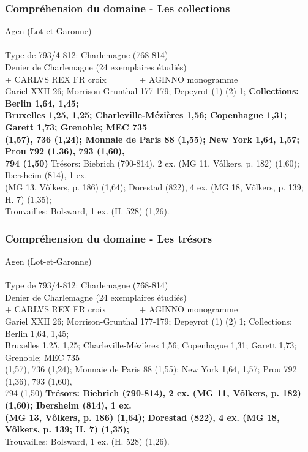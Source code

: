 \documentclass[10pt, compress]{beamer}
\begin{document}
\begin{frame}[fragile]
  \frametitle{Compréhension du domaine - Les collections}
  \begin{scriptsize}
\textcolor{light_gray}{Agen (Lot-et-Garonne)}\\~\\

\textcolor{light_gray}{
Type de 793/4-812: Charlemagne (768-814)\\
Denier de Charlemagne (24 exemplaires étudiés)\\
+ CARLVS REX FR croix~~~~~~~ + AGINNO monogramme
}\\
\textcolor{light_gray}{
Gariel XXII 26; Morrison-Grunthal 177-179; Depeyrot (1) (2) 1; }\textbf{Collections: Berlin 1,64, 1,45; \\
Bruxelles 1,25, 1,25; Charleville-Mézières 1,56; Copenhague 1,31; Garett 1,73; Grenoble; MEC 735 \\
(1,57), 736 (1,24); Monnaie de Paris 88 (1,55); New York 1,64, 1,57; Prou 792 (1,36), 793 (1,60), \\
794 (1,50) }\textcolor{light_gray}{Trésors: Biebrich (790-814), 2 ex. (MG 11, Vôlkers, p. 182) (1,60); Ibersheim (814), 1 ex. \\(MG 13, Vôlkers, p. 186) (1,64); Dorestad (822), 4 ex. (MG 18, Vôlkers, p. 139; H. 7) (1,35); \\Trouvailles: Bolsward, 1 ex. (H. 528) (1,26).
} 
    \end{scriptsize}
\end{frame}

\begin{frame}[fragile]
  \frametitle{Compréhension du domaine - Les trésors}
  \begin{scriptsize}
\textcolor{light_gray}{Agen (Lot-et-Garonne)}\\~\\

\textcolor{light_gray}{
Type de 793/4-812: Charlemagne (768-814)\\
Denier de Charlemagne (24 exemplaires étudiés)\\
+ CARLVS REX FR croix~~~~~~~ + AGINNO monogramme
}\\
\textcolor{light_gray}{
Gariel XXII 26; Morrison-Grunthal 177-179; Depeyrot (1) (2) 1;
Collections: Berlin 1,64, 1,45; \\
Bruxelles 1,25, 1,25; Charleville-Mézières 1,56; Copenhague 1,31; Garett 1,73; Grenoble; MEC 735 \\
(1,57), 736 (1,24); Monnaie de Paris 88 (1,55); New York 1,64, 1,57; Prou 792 (1,36), 793 (1,60), \\
794 (1,50) }\textbf{Trésors: Biebrich (790-814), 2 ex. (MG 11, Vôlkers, p. 182) (1,60); Ibersheim (814), 1 ex. \\
(MG 13, Vôlkers, p. 186) (1,64); Dorestad (822), 4 ex. (MG 18, Vôlkers, p. 139; H. 7) (1,35); }\\
\textcolor{light_gray}{
Trouvailles: Bolsward, 1 ex. (H. 528) (1,26).
} 
    \end{scriptsize}
\end{frame}
\end{document}
